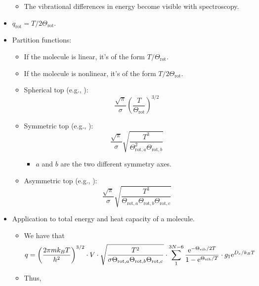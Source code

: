 \documentclass[../notes.tex]{subfiles}
\begin{document}
\begin{itemize}
    \begin{itemize}
        \item The vibrational differences in energy become visible with spectroscopy.
    \end{itemize}
    \item $q_\text{rot}=T/2\Theta_\text{rot}$.
    \item Partition functions:
    \begin{itemize}
        \item If the molecule is linear, it's of the form $T/\Theta_\text{rot}$.
        \item If the molecule is nonlinear, it's of the form $T/2\Theta_\text{rot}$.
        \item Spherical top (e.g., ):
        \begin{equation*}
            \frac{\sqrt{\pi}}{\sigma}\left( \frac{T}{\Theta_\text{rot}} \right)^{3/2}
        \end{equation*}
        \item Symmetric top (e.g., ):
        \begin{equation*}
            \frac{\sqrt{\pi}}{\sigma}\sqrt{\frac{T^3}{\Theta_{\text{rot},a}^2\Theta_{\text{rot},b}}}
        \end{equation*}
        \begin{itemize}
            \item $a$ and $b$ are the two different symmetry axes.
        \end{itemize}
        \item Asymmetric top (e.g., ):
        \begin{equation*}
            \frac{\sqrt{\pi}}{\sigma}\sqrt{\frac{T^3}{\Theta_{\text{rot},a}\Theta_{\text{rot},b}\Theta_{\text{rot},c}}}
        \end{equation*}
    \end{itemize}
    \item Application to total energy and heat capacity of a molecule.
    \begin{itemize}
        \item We have that
        \begin{equation*}
            q = \left( \frac{2\pi mk_BT}{h^2} \right)^{3/2}\cdot V\cdot\sqrt{\frac{T^2}{\sigma\Theta_{\text{rot},a}\Theta_{\text{rot},b}\Theta_{\text{rot},c}}}\cdot\sum_1^{3N-6}\frac{\e[-\Theta_\text{vib}/2T]}{1-\e[\Theta_\text{vib}/T]}\cdot g_1\e[D_e/k_BT]
        \end{equation*}
        \item Thus,

\end{itemize}
\end{itemize}
\end{document}
